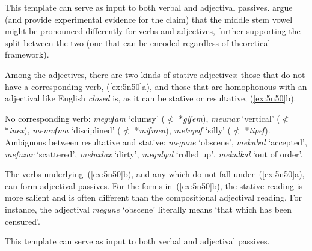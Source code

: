 \begin{exe}
\begin{xlist}
\begin{exe}
\begin{xlist}
\begin{exe}
\begin{exe}
\begin{xlist}
\begin{exe}
\begin{exe}
\begin{xlist}
\begin{exe}
\begin{xlist}
\begin{exe}
\begin{xlist}
\begin{exe}
\begin{xlist}
\begin{exe}
\begin{xlist}
\begin{xlist}
\begin{exe}
\begin{xlist}
\begin{exe}
\begin{xlist}
\begin{exe}
\begin{exe}
\begin{exe}
\begin{xlist}
\begin{exe}
\begin{exe}
\begin{xlist}
\begin{exe}
\begin{xlist}
\begin{exe}
\begin{xlist}
\begin{exe}
\begin{xlist}
\begin{xlist}
\begin{exe}
\begin{xlist}
\begin{exe}
\begin{xlist}
\begin{exe}
\begin{xlist}
\begin{exe}
\begin{xlist}
\begin{exe}
\begin{exe}
\begin{exe}
\begin{exe}
\begin{exe}
\begin{xlist}
\begin{xlist}
\begin{exe}
\begin{xlist}
\begin{exe}
\begin{xlist}
\begin{exe}
\begin{exe}
\begin{exe}
\begin{xlist}
This template can serve as input to both verbal and adjectival passives. \cite{lakscohen16} argue (and provide experimental evidence for the claim) that the middle stem vowel might be pronounced differently for verbs and adjectives, further supporting the split between the two (one that can be encoded regardless of theoretical framework).

Among the adjectives, there are two kinds of stative adjectives: those that do not have a corresponding verb, (\ref{ex:5n50}a), and those that are homophonous with an adjectival  like English \emph{closed} is, as it can be stative or resultative, (\ref{ex:5n50}b).
 \begin{exe}
 \ex  \label{ex:5n50}
 \begin{xlist} 
   \ex  No corresponding verb: \emph{meguʃam} `clumsy' ($\nless$ *\emph{giʃem}), \emph{meunax} `vertical' ($\nless$ *\emph{inex}), \emph{memuʃma} `disciplined' ($\nless$ *\emph{miʃmea}), \emph{metupaʃ} `silly' ($\nless$ *\emph{tipeʃ}). 
   \ex  Ambiguous between resultative and stative: \emph{megune} `obscene', \emph{mekubal} `accepted', \emph{mefuzar} `scattered', \emph{meluxlax} `dirty', \emph{megulgal} `rolled up', \emph{mekulkal} `out of order'.  
 \z
\z 


The verbs underlying~(\ref{ex:5n50}b), and any which do not fall under~(\ref{ex:5n50}a), can form adjectival passives. For the forms in~(\ref{ex:5n50}b), the stative reading is more salient and is often different than the compositional adjectival  reading. For instance, the adjectival  \emph{megune} `obscene' literally means `that which has been censured'.


This template can serve as input to both verbal and adjectival passives.


\end{xlist}
\end{exe}
\end{xlist}
\end{exe}
\end{exe}
\end{exe}
\end{xlist}
\end{exe}
\end{xlist}
\end{exe}
\end{xlist}
\end{xlist}
\end{exe}
\end{exe}
\end{exe}
\end{exe}
\end{exe}
\end{xlist}
\end{exe}
\end{xlist}
\end{exe}
\end{xlist}
\end{exe}
\end{xlist}
\end{exe}
\end{xlist}
\end{xlist}
\end{exe}
\end{xlist}
\end{exe}
\end{xlist}
\end{exe}
\end{xlist}
\end{exe}
\end{exe}
\end{xlist}
\end{exe}
\end{exe}
\end{exe}
\end{xlist}
\end{exe}
\end{xlist}
\end{exe}
\end{xlist}
\end{xlist}
\end{exe}
\end{xlist}
\end{exe}
\end{xlist}
\end{exe}
\end{xlist}
\end{exe}
\end{xlist}
\end{exe}
\end{exe}
\end{xlist}
\end{exe}
\end{exe}
\end{xlist}
\end{exe}
\end{xlist}
\end{exe}
